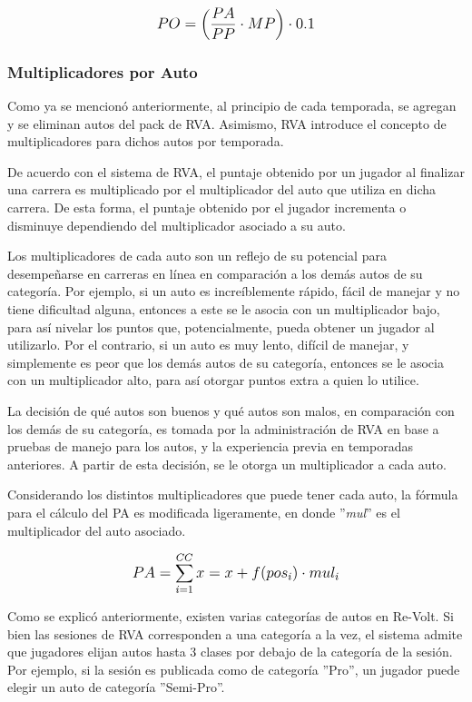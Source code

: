 \[
\mathlarger{{PO} = \left(\frac{PA}{PP} \cdot MP\right) \cdot 0.1}
\]

\subsubsection{Multiplicadores por Auto}
Como ya se mencionó anteriormente, al principio de cada temporada, se agregan y se eliminan autos del pack de RVA. Asimismo, RVA introduce el concepto de multiplicadores para dichos autos por temporada.

De acuerdo con el sistema de RVA, el puntaje obtenido por un jugador al finalizar una carrera es multiplicado por el multiplicador del auto que utiliza en dicha carrera. De esta forma, el puntaje obtenido por el jugador incrementa o disminuye dependiendo del multiplicador asociado a su auto.

Los multiplicadores de cada auto son un reflejo de su potencial para desempeñarse en carreras en línea en comparación a los demás autos de su categoría. Por ejemplo, si un auto es increíblemente rápido, fácil de manejar y no tiene dificultad alguna, entonces a este se le asocia con un multiplicador bajo, para así nivelar los puntos que, potencialmente, pueda obtener un jugador al utilizarlo. Por el contrario, si un auto es muy lento, difícil de manejar, y simplemente es peor que los demás autos de su categoría, entonces se le asocia con un multiplicador alto, para así otorgar puntos extra a quien lo utilice.

La decisión de qué autos son buenos y qué autos son malos, en comparación con los demás de su categoría, es tomada por la administración de RVA en base a pruebas de manejo para los autos, y la experiencia previa en temporadas anteriores. A partir de esta decisión, se le otorga un multiplicador a cada auto.

Considerando los distintos multiplicadores que puede tener cada auto, la fórmula para el cálculo del PA es modificada ligeramente, en donde ''\textit{mul}'' es el multiplicador del auto asociado.

\[
\mathlarger{{PA} = \sum_{i=1}^{CC}x=x+f(pos_i) \cdot mul_i}
\]

Como se explicó anteriormente, existen varias categorías de autos en Re-Volt. Si bien las sesiones de RVA corresponden a una categoría a la vez, el sistema admite que jugadores elijan autos hasta 3 clases por debajo de la categoría de la sesión. Por ejemplo, si la sesión es publicada como de categoría ''Pro'', un jugador puede elegir un auto de categoría ''Semi-Pro''.

